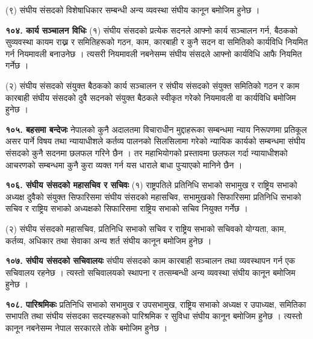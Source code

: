 (९) संघीय संसदको विशेषाधिकार सम्बन्धी अन्य व्यवस्था संघीय कानून बमोजिम हुनेछ ।

\textbf{१०४. कार्य सञ्चालन विधिः} (१) संघीय संसदको प्रत्येक सदनले आफ्नो कार्य सञ्चालन गर्न, बैठकको सुव्यवस्था कायम राख्न र समितिहरूको गठन, काम, कारबाही र कुनै सदन वा समितिको कार्यविधि नियमित गर्न नियमावली बनाउनेछ । त्यसरी नियमावली नबनेसम्म संघीय संसदले आफ्नो कार्यविधि आफै नियमित गर्नेछ ।

(२) संघीय संसदको संयुक्त बैठकको कार्य सञ्चालन र संघीय संसदको संयुक्त समितिको गठन र काम कारबाही संघीय संसदको दुवै सदनको संयुक्त बैठकले स्वीकृत गरेको नियमावली वा कार्यविधि बमोजिम हुनेछ ।

\textbf{१०५. बहसमा बन्देजः} नेपालको कुनै अदालतमा विचाराधीन मुद्दाहरूका सम्बन्धमा न्याय निरूपणमा प्रतिकूल असर पार्ने विषय तथा न्यायाधीशले कर्तव्य पालनको सिलसिलामा गरेको न्यायिक कार्यको सम्बन्धमा संघीय संसदको कुनै सदनमा छलफल गरिने छैन । तर महाभियोगको प्रस्तावमा छलफल गर्दा न्यायाधीशको आचरणको सम्बन्धमा कुनै कुरा व्यक्त गर्न यस धाराले बाधा पुर्‍याएको मानिने छैन ।

\textbf{१०६. संघीय संसदको महासचिव र सचिवः} (१) राष्ट्रपतिले प्रतिनिधि सभाको सभामुख र राष्ट्रिय सभाको अध्यक्ष दुवैको संयुक्त सिफारिसमा संघीय संसदको महासचिव, सभामुखको सिफारिसमा प्रतिनिधि सभाको सचिव र राष्ट्रिय सभाको अध्यक्षको सिफारिसमा राष्ट्रिय सभाको सचिव नियुक्त गर्नेछ ।

(२) संघीय संसदको महासचिव, प्रतिनिधि सभाको सचिव र राष्ट्रिय सभाको सचिवको योग्यता, काम, कर्तव्य, अधिकार तथा सेवाका अन्य शर्त संघीय कानून बमोजिम हुनेछ ।

\textbf{१०७. संघीय संसदको सचिवालयः} संघीय संसदको काम कारबाही सञ्चालन तथा व्यवस्थापन गर्न एक सचिवालय रहनेछ । त्यस्तो सचिवालयको स्थापना र तत्सम्बन्धी अन्य व्यवस्था संघीय कानून बमोजिम हुनेछ ।

\textbf{१०८. पारिश्रमिकः} प्रतिनिधि सभाको सभामुख र उपसभामुख, राष्ट्रिय सभाको अध्यक्ष र उपाध्यक्ष, समितिका सभापति तथा संघीय संसदका सदस्यहरूको पारिश्रमिक र सुविधा संघीय कानून बमोजिम हुनेछ । त्यस्तो कानून नबनेसम्म नेपाल सरकारले तोके बमोजिम हुनेछ ।

 